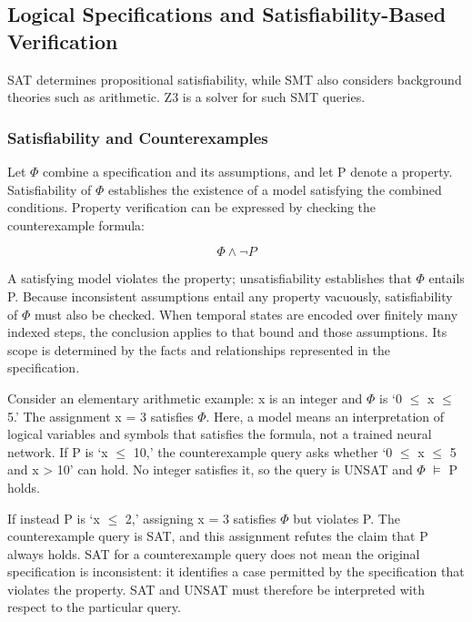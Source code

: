 \documentclass[nolineno]{ieeeaccess}
\begin{document}
\subsection{Logical Specifications and Satisfiability-Based Verification}

SAT determines propositional satisfiability, while SMT also considers background theories such as arithmetic. \cite{r11} Z3 is a solver for such SMT queries. \cite{r12}\par

\subsubsection{Satisfiability and Counterexamples}

Let \ensuremath{\Phi} combine a specification and its assumptions, and let P denote a property. Satisfiability of \ensuremath{\Phi} establishes the existence of a model satisfying the combined conditions. Property verification can be expressed by checking the counterexample formula:\par

\[\Phi\land\neg P\]

A satisfying model violates the property; unsatisfiability establishes that \ensuremath{\Phi} entails P. Because inconsistent assumptions entail any property vacuously, satisfiability of \ensuremath{\Phi} must also be checked. When temporal states are encoded over finitely many indexed steps, the conclusion applies to that bound and those assumptions. Its scope is determined by the facts and relationships represented in the specification. \cite{r11}\par

Consider an elementary arithmetic example: x is an integer and \ensuremath{\Phi} is ‘0 \ensuremath{\leq} x \ensuremath{\leq} 5.’ The assignment x = 3 satisfies \ensuremath{\Phi}. Here, a model means an interpretation of logical variables and symbols that satisfies the formula, not a trained neural network. If P is ‘x \ensuremath{\leq} 10,’ the counterexample query asks whether ‘0 \ensuremath{\leq} x \ensuremath{\leq} 5 and x > 10’ can hold. No integer satisfies it, so the query is UNSAT and \ensuremath{\Phi} \ensuremath{\models} P holds.\par

If instead P is ‘x \ensuremath{\leq} 2,’ assigning x = 3 satisfies \ensuremath{\Phi} but violates P. The counterexample query is SAT, and this assignment refutes the claim that P always holds. SAT for a counterexample query does not mean the original specification is inconsistent: it identifies a case permitted by the specification that violates the property. SAT and UNSAT must therefore be interpreted with respect to the particular query.\par
\end{document}

